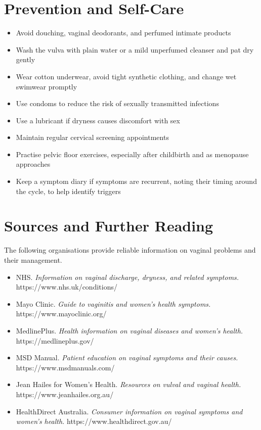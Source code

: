 \section*{Prevention and Self-Care}
\begin{itemize}
    \item Avoid douching, vaginal deodorants, and perfumed intimate products
    \item Wash the vulva with plain water or a mild unperfumed cleanser and pat dry gently
    \item Wear cotton underwear, avoid tight synthetic clothing, and change wet swimwear promptly
    \item Use condoms to reduce the risk of sexually transmitted infections
    \item Use a lubricant if dryness causes discomfort with sex
    \item Maintain regular cervical screening appointments
    \item Practise pelvic floor exercises, especially after childbirth and as menopause approaches
    \item Keep a symptom diary if symptoms are recurrent, noting their timing around the cycle, to help identify triggers
\end{itemize}

\section*{Sources and Further Reading}
The following organisations provide reliable information on vaginal problems and their management.

\begin{itemize}
    \item NHS. \textit{Information on vaginal discharge, dryness, and related symptoms.} https://www.nhs.uk/conditions/
    \item Mayo Clinic. \textit{Guide to vaginitis and women's health symptoms.} https://www.mayoclinic.org/
    \item MedlinePlus. \textit{Health information on vaginal diseases and women's health.} https://medlineplus.gov/
    \item MSD Manual. \textit{Patient education on vaginal symptoms and their causes.} https://www.msdmanuals.com/
    \item Jean Hailes for Women's Health. \textit{Resources on vulval and vaginal health.} https://www.jeanhailes.org.au/
    \item HealthDirect Australia. \textit{Consumer information on vaginal symptoms and women's health.} https://www.healthdirect.gov.au/
\end{itemize}
